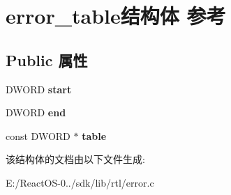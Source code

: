 \hypertarget{structerror__table}{}\section{error\+\_\+table结构体 参考}
\label{structerror__table}
\subsection*{Public 属性}
\begin{DoxyCompactItemize}
\item 
\mbox{\label{structerror__table_a3fdd4af5531e2a6ef49bf97006d897ea}} 
D\+W\+O\+RD {\bfseries start}
\item 
\mbox{\label{structerror__table_a1debeaa5dcc087c595b29775196721bb}} 
D\+W\+O\+RD {\bfseries end}
\item 
\mbox{\label{structerror__table_a1324236f1bdd6e51ac261d0e7eaebd92}} 
const D\+W\+O\+RD $\ast$ {\bfseries table}
\end{DoxyCompactItemize}


该结构体的文档由以下文件生成\+:\begin{DoxyCompactItemize}
\item 
E\+:/\+React\+O\+S-\/0../sdk/lib/rtl/error.\+c\end{DoxyCompactItemize}
